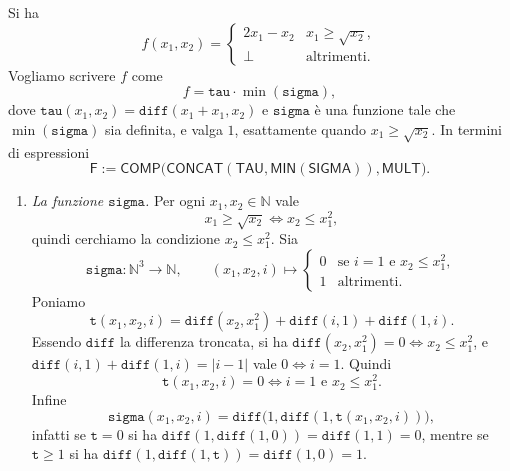 \begin{sol}
Si ha
\[
    f(x_1,x_2)=
    \begin{cases}
        2x_1-x_2 & x_1\geq\sqrt{x_2},\\
        \bot & \text{altrimenti.}
    \end{cases}
\]
Vogliamo scrivere $f$ come
\[
    f=\texttt{tau}\cdot\min(\texttt{sigma}),
\]
dove $\texttt{tau}(x_1,x_2)=\texttt{diff}(x_1+x_1,x_2)$ e $\texttt{sigma}$ è una funzione tale che $\min(\texttt{sigma})$ sia definita, e valga $1$, esattamente quando $x_1\geq\sqrt{x_2}$. In termini di espressioni
\[
    \mathsf F:=\mathsf{COMP}\bigl(\mathsf{CONCAT}(\mathsf{TAU},\mathsf{MIN}(\mathsf{SIGMA})),\mathsf{MULT}\bigr).
\]

\begin{enumerate}
    \item \emph{La funzione $\texttt{sigma}$.} Per ogni $x_1,x_2\in\mathbb N$ vale
    \[
        x_1\geq\sqrt{x_2}\iff x_2\leq x_1^2,
    \]
    quindi cerchiamo la condizione $x_2\leq x_1^2$. Sia
    \[
        \texttt{sigma}\colon\mathbb N^3\to\mathbb N,\qquad (x_1,x_2,i)\longmapsto
        \begin{cases}
            0 & \text{se } i=1 \text{ e } x_2\leq x_1^2,\\
            1 & \text{altrimenti.}
        \end{cases}
    \]
    Poniamo
    \[
        \texttt{t}(x_1,x_2,i)=\texttt{diff}(x_2,x_1^2)+\texttt{diff}(i,1)+\texttt{diff}(1,i).
    \]
    Essendo $\texttt{diff}$ la differenza troncata, si ha $\texttt{diff}(x_2,x_1^2)=0\iff x_2\leq x_1^2$, e $\texttt{diff}(i,1)+\texttt{diff}(1,i)=|i-1|$ vale $0\iff i=1$. Quindi
    \[
        \texttt{t}(x_1,x_2,i)=0\iff i=1\text{ e }x_2\leq x_1^2.
    \]
    Infine
    \[
        \texttt{sigma}(x_1,x_2,i)=\texttt{diff}\bigl(1,\texttt{diff}(1,\texttt{t}(x_1,x_2,i))\bigr),
    \]
    infatti se $\texttt{t}=0$ si ha $\texttt{diff}(1,\texttt{diff}(1,0))=\texttt{diff}(1,1)=0$, mentre se $\texttt{t}\geq1$ si ha $\texttt{diff}(1,\texttt{diff}(1,\texttt{t}))=\texttt{diff}(1,0)=1$.


\end{enumerate}
\end{sol}
